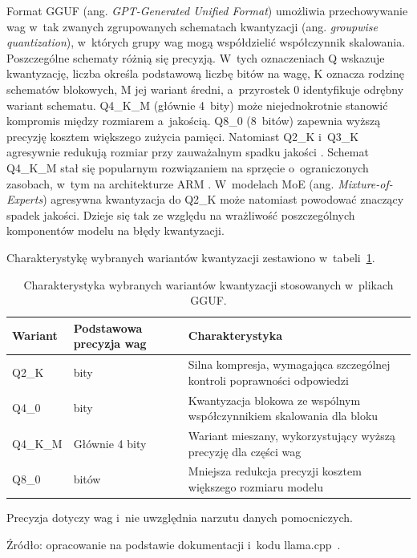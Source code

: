 Format GGUF (ang. \textit{GPT-Generated Unified Format}) umożliwia przechowywanie wag w~tak zwanych zgrupowanych schematach kwantyzacji (ang. \textit{groupwise quantization}), w~których grupy wag mogą współdzielić współczynnik skalowania. Poszczególne schematy różnią się precyzją. W~tych oznaczeniach Q wskazuje kwantyzację, liczba określa podstawową liczbę bitów na wagę, K oznacza rodzinę schematów blokowych, M jej wariant średni, a~przyrostek 0 identyfikuje odrębny wariant schematu. Q4\_K\_M (głównie 4~bity) może niejednokrotnie stanowić kompromis między rozmiarem a~jakością. Q8\_0 (8~bitów) zapewnia wyższą precyzję kosztem większego zużycia pamięci. Natomiast Q2\_K i~Q3\_K agresywnie redukują rozmiar przy zauważalnym spadku jakości \cite{Kurt2026}. Schemat Q4\_K\_M stał się popularnym rozwiązaniem na sprzęcie o~ograniczonych zasobach, w~tym na architekturze ARM \cite{Renney2026}. W~modelach MoE (ang. \textit{Mixture-of-Experts}) agresywna kwantyzacja do Q2\_K może natomiast powodować znaczący spadek jakości. Dzieje się tak ze względu na wrażliwość poszczególnych komponentów modelu na błędy kwantyzacji.

Charakterystykę wybranych wariantów kwantyzacji zestawiono w~tabeli~\ref{tab:warianty_gguf_przeglad}.

\begin{table}[H]
  \centering
  \caption{Charakterystyka wybranych wariantów kwantyzacji stosowanych w~plikach GGUF.}
  \label{tab:warianty_gguf_przeglad}
  \begingroup
  \small
  \renewcommand{\arraystretch}{1.2}
  \begin{tabular}{@{}>{\raggedright\arraybackslash}p{}>{\raggedright\arraybackslash}p{}>{\raggedright\arraybackslash}p{}@{}}
    \hline
    Wariant & Podstawowa precyzja wag & Charakterystyka \\
    \hline
    Q2\_K & 2 bity & Silna kompresja, wymagająca szczególnej kontroli poprawności odpowiedzi \\
    Q4\_0 & 4 bity & Kwantyzacja blokowa ze wspólnym współczynnikiem skalowania dla bloku \\
    Q4\_K\_M & Głównie 4 bity & Wariant mieszany, wykorzystujący wyższą precyzję dla części wag \\
    Q8\_0 & 8 bitów & Mniejsza redukcja precyzji kosztem większego rozmiaru modelu \\
    \hline
  \end{tabular}
  \par\smallskip
  Precyzja dotyczy wag i~nie uwzględnia narzutu danych pomocniczych.
  \par\smallskip
  Źródło: opracowanie na podstawie dokumentacji i~kodu llama.cpp~\cite{LlamaCppQuantization}.
  \endgroup
\end{table}

